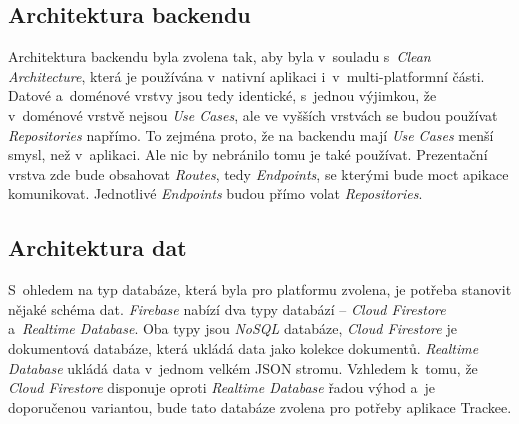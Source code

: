 \subsection{Architektura backendu}

Architektura backendu byla zvolena tak, aby byla v~souladu s~\emph{Clean Architecture}, která je používána v~nativní aplikaci i~v~multi-platformní části. Datové a~doménové vrstvy jsou tedy identické, s~jednou výjimkou, že v~doménové vrstvě nejsou \emph{Use Cases}, ale ve vyšších vrstvách se budou používat \emph{Repositories} napřímo. To zejména proto, že na backendu mají \emph{Use Cases} menší smysl, než v~aplikaci. Ale nic by nebránilo tomu je také používat. Prezentační vrstva zde bude obsahovat \emph{Routes}, tedy \emph{Endpoints}, se kterými bude moct apikace komunikovat. Jednotlivé \emph{Endpoints} budou přímo volat \emph{Repositories}.

\subsection{Architektura dat}

S~ohledem na typ databáze, která byla pro platformu zvolena, je potřeba stanovit nějaké schéma dat. \emph{Firebase} nabízí dva typy databází – \emph{Cloud Firestore} a~\emph{Realtime Database}. Oba typy jsou \emph{NoSQL} databáze, \emph{Cloud Firestore} je dokumentová databáze, která ukládá data jako kolekce dokumentů. \emph{Realtime Database} ukládá data v~jednom velkém JSON stromu. Vzhledem k~tomu, že \emph{Cloud Firestore} disponuje oproti \emph{Realtime Database} řadou výhod a~je doporučenou variantou, bude tato databáze zvolena pro potřeby aplikace Trackee. \cite{rtdb-vs-firestore}


